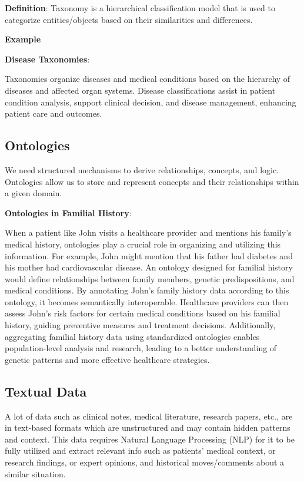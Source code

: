 \documentclass[12pt]{report}
\begin{document}
\textbf{Definition}: Taxonomy is a hierarchical classification model that is
used to categorize entities/objects based on their similarities and
differences.

\textbf{Example}

\textbf{Disease Taxonomies}:

Taxonomies organize diseases and medical conditions based on the hierarchy of
diseases and affected organ systems. Disease classifications assist in patient
condition analysis, support clinical decision, and disease management,
enhancing patient care and outcomes.

\subsection{Ontologies}

We need structured mechanisms to derive relationships, concepts, and logic.
Ontologies allow us to store and represent concepts and their relationships
within a given domain.

\textbf{Ontologies in Familial History}:

When a patient like John visits a healthcare provider and mentions his family's
medical history, ontologies play a crucial role in organizing and utilizing
this information. For example, John might mention that his father had diabetes
and his mother had cardiovascular disease. An ontology designed for familial
history would define relationships between family members, genetic
predispositions, and medical conditions. By annotating John's family history
data according to this ontology, it becomes semantically interoperable.
Healthcare providers can then assess John's risk factors for certain medical
conditions based on his familial history, guiding preventive measures and
treatment decisions. Additionally, aggregating familial history data using
standardized ontologies enables population-level analysis and research, leading
to a better understanding of genetic patterns and more effective healthcare
strategies.

\subsection{Textual Data}

A lot of data such as clinical notes, medical literature, research papers,
etc., are in text-based formats which are unstructured and may contain hidden
patterns and context. This data requires Natural Language Processing (NLP) for
it to be fully utilized and extract relevant info such as patients' medical
context, or research findings, or expert opinions, and historical
moves/comments about a similar situation.
\end{document}
